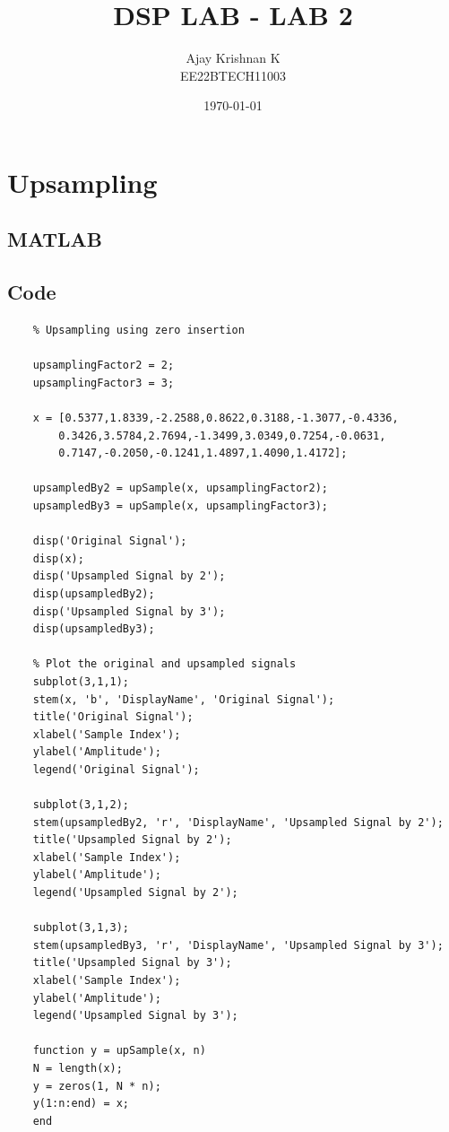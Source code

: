 \documentclass[a4paper,12pt]{article}
\title{\textbf{DSP LAB - LAB 2}}
\author{Ajay Krishnan K \\ EE22BTECH11003}
\date{\today}
\begin{document}
\maketitle

\section{Upsampling}
\subsection{MATLAB}
\subsection*{Code}
\begin{lstlisting}
    % Upsampling using zero insertion

    upsamplingFactor2 = 2;
    upsamplingFactor3 = 3;
    
    x = [0.5377,1.8339,-2.2588,0.8622,0.3188,-1.3077,-0.4336,
        0.3426,3.5784,2.7694,-1.3499,3.0349,0.7254,-0.0631,
        0.7147,-0.2050,-0.1241,1.4897,1.4090,1.4172];
    
    upsampledBy2 = upSample(x, upsamplingFactor2);
    upsampledBy3 = upSample(x, upsamplingFactor3);
    
    disp('Original Signal');
    disp(x);
    disp('Upsampled Signal by 2');
    disp(upsampledBy2);
    disp('Upsampled Signal by 3');
    disp(upsampledBy3);
    
    % Plot the original and upsampled signals
    subplot(3,1,1);
    stem(x, 'b', 'DisplayName', 'Original Signal');
    title('Original Signal');
    xlabel('Sample Index');
    ylabel('Amplitude');
    legend('Original Signal');
    
    subplot(3,1,2);
    stem(upsampledBy2, 'r', 'DisplayName', 'Upsampled Signal by 2');
    title('Upsampled Signal by 2');
    xlabel('Sample Index');
    ylabel('Amplitude');
    legend('Upsampled Signal by 2');
    
    subplot(3,1,3);
    stem(upsampledBy3, 'r', 'DisplayName', 'Upsampled Signal by 3');
    title('Upsampled Signal by 3');
    xlabel('Sample Index');
    ylabel('Amplitude');
    legend('Upsampled Signal by 3');
    
    function y = upSample(x, n)
    N = length(x);
    y = zeros(1, N * n);
    y(1:n:end) = x;
    end
\end{lstlisting}
\end{document}
